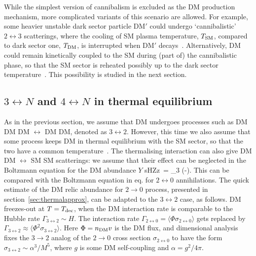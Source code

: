 \medskip

While the simplest version of cannibalism is excluded as the DM production mechanism, more complicated variants of this scenario are allowed.
For example, some heavier unstable dark sector particle DM$'$ could
undergo `cannibalistic' $2\leftrightarrow 3$ scatterings, 
where the cooling of SM plasma temperature, $T_{\rm SM}$, compared to dark sector one, $T_{\rm DM}$, is interrupted when DM$'$ decays~\cite{cannibalism}.
Alternatively, DM could remain kinetically coupled to the SM during (part of) the cannibalistic phase, 
so that the SM sector is reheated possibly up to the dark sector temperature~\cite{cannibalism,MeVDM}.
This possibility is studied in the next section.

\subsection{$3\leftrightarrow N$ and $4\leftrightarrow N$ in thermal equilibrium}\label{sec:3<->2eq}
As in the previous section, we assume that DM undergoes processes such as 
DM DM DM $\leftrightarrow$ DM DM, denoted as $3\leftrightarrow 2$.
However, this time we also assume that some process keeps DM in thermal equilibrium with the SM sector, 
so that the two have a common temperature~\cite{MeVDM}.
The thermalising interaction can also give DM DM $\leftrightarrow$ SM SM scatterings: 
we assume that their effect can be neglected
in the Boltzmann equation for the DM abundance $Y$ 
\beq sHZz\, 
  =  \gamma_{3}  \left(-\right).\eeq
This can be compared with the Boltzmann equation  in eq. for $2\leftrightarrow 0$ annihilations.
The quick estimate of the DM relic abundance for $2\to 0$ process, presented in section~\ref{sec:thermalapprox}, can be 
adapted to the $3\leftrightarrow 2$ case, as follows.
DM freezes-out at $T=T_{\rm dec}$, when the DM interaction rate is comparable to the Hubble rate $\Gamma_{3\leftrightarrow 2} \sim H$.
The interaction rate $\Gamma_{2\leftrightarrow0}=\langle \Phi \sigma_{2\leftrightarrow0} \rangle$ 
gets replaced by $\Gamma_{3\leftrightarrow 2} \approx  \langle \Phi^2\sigma_{3\leftrightarrow2}\rangle$.
Here $\Phi =n_{\rm DM} v$ is the DM flux, and dimensional analysis fixes 
the $3\to2$ analog of the $2\to 0$ cross section $\sigma_{2\leftrightarrow0}$
to have the form $\sigma_{3\leftrightarrow2} \sim \alpha^3/ M^5$,
where $g$ is some DM self-coupling and $\alpha=g^2/4\pi$.
